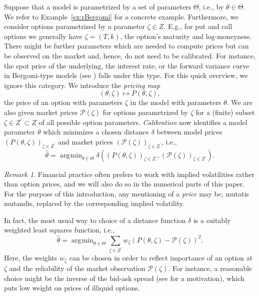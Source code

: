 \documentclass{article}
\theoremstyle{remark}
\newtheorem{remark}{Remark}
\DeclareMathOperator*{\argmin}{\arg\!\min}
\begin{document}
Suppose that a model is parametrized by a set of parameters $\Theta$, i.e., by
$\theta \in \Theta$. We refer to Example~\ref{ex:rBergomi} for a concrete
example. Furthermore, we consider options parametrized by a parameter
$\zeta \in Z$. E.g., for put and call options we generally have
$\zeta = (T,k)$, the option's maturity and log-moneyness. There might be
further parameters which are needed to compute prices but can be observed on
the market and, hence, do not need to be calibrated. For instance, the spot
price of the underlying, the interest rate, or the forward variance curve in
Bergomi-type models (see \cite{BergomiBook}) falls under this type. For this
quick overview, we ignore this category. We introduce the \emph{pricing map}
\begin{equation*}
  (\theta, \zeta) \mapsto P(\theta, \zeta),
\end{equation*}
the price of an option with parameters $\zeta$ in the model with parameters
$\theta$. We are also given market prices $\mathcal{P}(\zeta)$ for options
parametrized by $\zeta$ for a (finite) subset $\zeta \in Z^\prime \subset Z$
of all possible option parameters. \emph{Calibration} now identifies a model
parameter $\theta$ which minimizes a chosen distance $\delta$ between model
prices $\left( P(\theta, \zeta) \right)_{\zeta \in Z^\prime}$ and market
prices $\left( \mathcal{P}(\zeta) \right)_{\zeta \in Z^\prime}$, i.e.,
\begin{equation*}
  \widehat{\theta} = \argmin_{\theta \in \Theta} \delta\left( \left( P(\theta,
      \zeta) \right)_{\zeta \in Z^\prime},  \left( \mathcal{P}(\zeta)
    \right)_{\zeta \in Z^\prime} \right).
\end{equation*}

\begin{remark}
  \label{rem:price=IV}
  Financial practice often prefers to work with implied volatilities rather
  than option prices, and we will also do so in the numerical parts of this
  paper. For the purpose of this introduction, any mentioning of a
  \emph{price} may be, mutatis mutandis, replaced by the corresponding implied
  volatility.
\end{remark}

In fact, the most usual way to choice of a distance function $\delta$ is a
suitably weighted least squares function, i.e.,
\begin{equation*}
  \widehat{\theta} = \argmin_{\theta \in \Theta} \sum_{\zeta \in Z^\prime}
  w_\zeta \left(P(\theta, \zeta) - \mathcal{P}(\zeta)\right)^2.
\end{equation*}
Here, the weights $w_\zeta$ can be chosen in order to reflect importance of an
option at $\zeta$ and the reliability of the market observation
$\mathcal{P}(\zeta)$. For instance, a reasonable choice might be the inverse
of the bid-ask spread (see \cite{Cont10} for a motivation), which puts low weight on prices of illiquid options.
\end{document}
